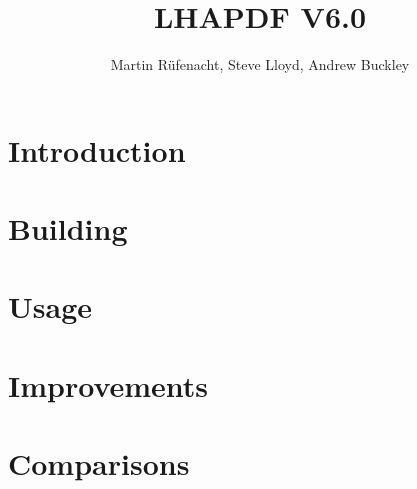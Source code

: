 \documentclass{article}
\begin{document}
\title{LHAPDF V6.0}
\author{Martin R\"{u}fenacht, Steve Lloyd, Andrew Buckley}
\maketitle

\section{Introduction}


\section{Building}


\section{Usage}


\section{Improvements}


\section{Comparisons}
\end{document}
